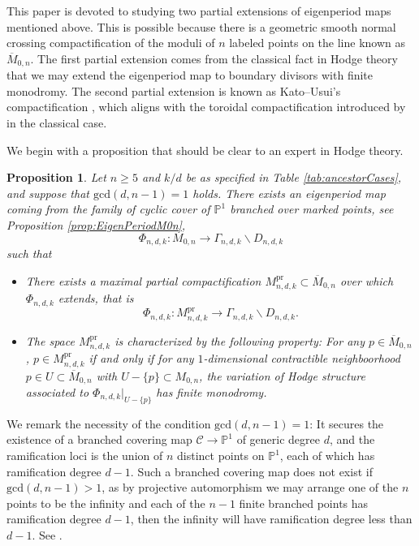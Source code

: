 \documentclass[12pt, letterpaper]{amsart}
\theoremstyle{plain}
\newtheorem{proposition}[theorem]{Proposition}
\theoremstyle{definition}
\begin{document}
This paper is devoted to studying two partial extensions of eigenperiod maps mentioned above. 
This is possible because there is a geometric smooth normal crossing compactification of the moduli of $n$ labeled points on the line known as $\overline{M}_{0,n}$. The first partial extension comes from the classical fact in Hodge theory that we may extend the eigenperiod map to boundary divisors with finite monodromy. The second partial extension is known as Kato--Usui's compactification
\cite{KU08}, which aligns with the toroidal compactification introduced by \cite{AMRT10} in the classical case. 


We begin with a proposition that should be clear to an expert in Hodge theory. 

\begin{proposition}
\label{prop:extension}
Let $n \geq 5$ and $k/d$ be as specified in Table \ref{tab:ancestorCases}, and suppose that $ \mathrm{gcd}(d,n-1)=1$ holds. There exists an eigenperiod map coming from the family of cyclic cover of $\mathbb{P}^1$ branched over marked points, see Proposition \ref{prop:EigenPeriodM0n},      
\[
\Phi_{n,d,k}:M_{0,n} \to
\Gamma_{n,d,k}\backslash D_{n,d,k}
\]
such that 
\begin{itemize}
    \item[(i)]  There exists a maximal partial compactification $M_{n,d,k}^{\mathrm{pr}} \subset \overline{M}_{0,n}$ over which $\Phi_{n,d,k}$ extends, that is 
    \[
    \Phi_{n,d,k}:M_{n,d,k}^{\mathrm{pr}} \to
    \Gamma_{n,d,k}\backslash D_{n,d,k}.
    \]
    \item[(ii)]
    The space $M_{n,d,k}^{\mathrm{pr}}$ is characterized by the following property: For any $p\in \overline{M}_{0,n}$, $p\in M_{n,d,k}^{\mathrm{pr}}$ if and only if for any $1$-dimensional contractible neighboorhood $p\in U\subset \overline{M}_{0,n}$ with $U-\{p\}\subset M_{0,n}$, the variation of Hodge structure associated to $\Phi_{n,d,k}|_{U-\{p\}}$ has finite monodromy. 
    
\end{itemize}
\end{proposition}
We remark the necessity of the condition $\mathrm{gcd}(d, n-1)=1$: It secures the existence of a branched covering map $\mathcal{C}\rightarrow \mathbb{P}^1$ of generic degree $d$, and the ramification loci is the union of $n$ distinct points on $\mathbb{P}^1$, each of which has ramification degree $d-1$. Such a branched covering map does not exist if $\mathrm{gcd}(d, n-1)>1$, as by projective automorphism we may arrange one of the $n$ points to be the infinity and each of the $n-1$ finite branched points has ramification degree $d-1$, then the infinity will have ramification degree less than $d-1$. See \cite[Sec. 3]{McM13}.
\end{document}
